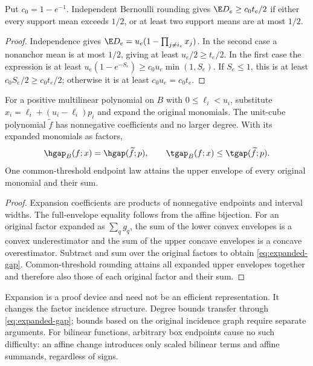 \begin{lemma}\label{lem:easy-terms}
Put $c_0=1-e^{-1}$. Independent Bernoulli rounding gives
$\E D_e\ge c_0t_e/2$ if either every support mean exceeds $1/2$, or at
least two support means are at most $1/2$.
\end{lemma}
\begin{proof}
Independence gives $\E D_e=u_e(1-\prod_{j\ne i_e}x_j)$. In the second
case a nonanchor mean is at most $1/2$, giving at least $u_e/2\ge t_e/2$.
In the first case the expression is at least
$u_e(1-e^{-S_e})\ge c_0u_e\min(1,S_e)$. If $S_e\le1$, this is at least
$c_0S_e/2\ge c_0t_e/2$; otherwise it is at least $c_0u_e=c_0t_e$.
\end{proof}

\begin{proposition}\label{prop:box-transfer}
For a positive multilinear polynomial on $B$ with $0\le\ell_i<u_i$,
substitute $x_i=\ell_i+(u_i-\ell_i)p_i$ and expand the original monomials.
The unit-cube polynomial $\widetilde f$ has nonnegative coefficients and
no larger degree. With its expanded monomials as factors,
\begin{equation}\label{eq:expanded-gap}
 \hgap_B(f;x)=\hgap(\widetilde f;p),\qquad
 \tgap_B(f;x)\le\tgap(\widetilde f;p).
\end{equation}
One common-threshold endpoint law attains the upper envelope of every
original monomial and their sum.
\end{proposition}
\begin{proof}
Expansion coefficients are products of nonnegative endpoints and interval
widths. The full-envelope equality follows from the affine bijection.
For an original factor expanded as $\sum_q g_q$, the sum of the lower
convex envelopes is a convex underestimator and the sum of the upper
concave envelopes is a concave overestimator. Subtract and sum over the
original factors to obtain \eqref{eq:expanded-gap}. Common-threshold
rounding attains all expanded upper envelopes together and therefore also
those of each original factor and their sum.
\end{proof}

Expansion is a proof device and need not be an efficient representation.
It changes the factor incidence structure. Degree bounds transfer through
\eqref{eq:expanded-gap}; bounds based on the original incidence graph
require separate arguments. For bilinear functions, arbitrary box endpoints
cause no such difficulty: an affine change introduces only scaled bilinear
terms and affine summands, regardless of signs.

